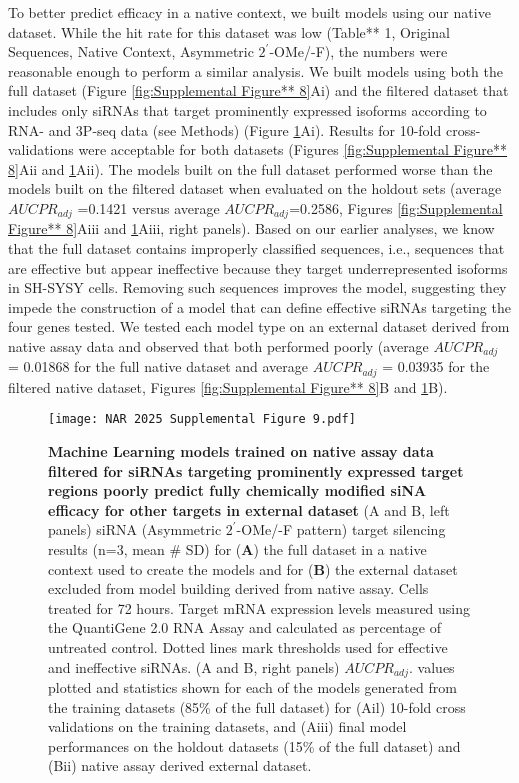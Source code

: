 \documentclass{report}
\begin{document}
To better predict efficacy in a native context, we built models using our native dataset. While the hit rate for this dataset was low (Table** 1, Original Sequences, Native Context, Asymmetric $2^\prime$-OMe/-F), the numbers were reasonable enough to perform a similar analysis. We built models using both the full dataset (Figure \ref{fig:Supplemental Figure** 8}Ai) and the filtered dataset that includes only siRNAs that target prominently expressed isoforms according to RNA- and 3P-seq data (see Methods) (Figure \ref{fig:Supplemental Figure** 9}Ai). Results for 10-fold cross-validations were acceptable for both datasets (Figures \ref{fig:Supplemental Figure** 8}Aii and \ref{fig:Supplemental Figure** 9}Aii). The models built on the full dataset performed worse than the models built on the filtered dataset when evaluated on the holdout sets (average $AUCPR_{adj}$ =0.1421 versus average $AUCPR_{adj}$=0.2586, Figures \ref{fig:Supplemental Figure** 8}Aiii and \ref{fig:Supplemental Figure** 9}Aiii, right panels). Based on our earlier analyses, we know that the full dataset contains improperly classified sequences, i.e., sequences that are effective but appear ineffective because they target underrepresented isoforms in SH-SYSY cells. Removing such sequences improves the model, suggesting they impede the construction of a model that can define effective siRNAs targeting the four genes tested. We tested each model type on an external dataset derived from native assay data and observed that both performed poorly (average $AUCPR_{adj}$ = 0.01868 for the full native dataset and average $AUCPR_{adj}$ = 0.03935 for the filtered native dataset, Figures \ref{fig:Supplemental Figure** 8}B and \ref{fig:Supplemental Figure** 9}B).
\begin{figure}
    \centering
    \texttt{[image: NAR 2025 Supplemental Figure 9.pdf]}
    \caption{\textbf{Machine Learning models trained on native assay data filtered for siRNAs targeting prominently expressed target regions poorly predict fully chemically modified siNA efficacy for other targets in external dataset} (A and B, left panels) siRNA (Asymmetric $2^\prime$-OMe/-F pattern) target silencing results (n=3, mean \# SD) for (\textbf{A}) the full dataset in a native context used to create the models and for (\textbf{B}) the external dataset excluded from model building derived from native assay. Cells treated for 72 hours. Target mRNA expression levels measured using the QuantiGene 2.0 RNA Assay and calculated as percentage of untreated control. Dotted lines mark thresholds used for effective and ineffective siRNAs. (A and B, right panels) $AUCPR_{adj}$. values plotted and statistics shown for each of the models generated from the training datasets (85\% of the full dataset) for (Ail) 10-fold cross validations on the training datasets, and (Aiii) final model performances on the holdout datasets (15\% of the full dataset) and (Bii) native assay derived external dataset.
}
    \label{fig:Supplemental Figure** 9}
\end{figure}
\end{document}
